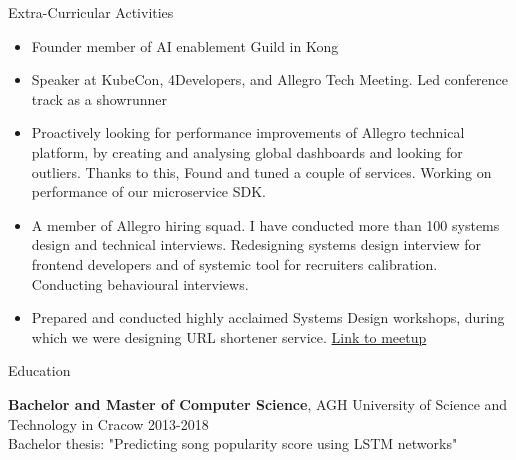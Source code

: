 \documentclass{resume} %
\begin{document}
\begin{rSection}{Extra-Curricular Activities} 
\begin{itemize}
    \item Founder member of AI enablement Guild in Kong
    \item Speaker at KubeCon, 4Developers, and Allegro Tech Meeting. Led conference track as a showrunner
    \item Proactively looking for performance improvements of Allegro technical platform, by creating and analysing global dashboards and looking for outliers. Thanks to this, Found and tuned a couple of services. Working on performance of our microservice SDK.
    \item A member of Allegro hiring squad. I have conducted more than 100 systems design and technical interviews. Redesigning systems design interview for frontend developers and of systemic tool for recruiters calibration. Conducting behavioural interviews.
    \item Prepared and conducted highly acclaimed Systems Design workshops, during which we were designing URL shortener service. \href{https://www.meetup.com/allegrotech/events/282421464/}{Link to meetup}
\end{itemize}

\end{rSection}


\begin{rSection}{Education}

{\bf Bachelor and Master of Computer Science}, AGH University of Science and Technology in Cracow \hfill {2013-2018}\\
Bachelor thesis: "Predicting song popularity score using LSTM networks"


\end{rSection}



\end{document}
